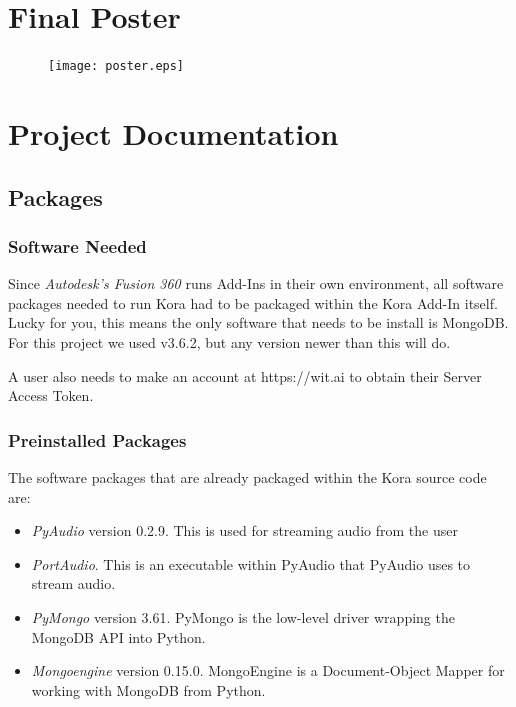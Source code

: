\documentclass[onecolumn, draftclsnofoot,10pt, compsoc]{IEEEtran}
\begin{document}
\section{Final Poster}
	\begin{figure}[H]
		\texttt{[image: poster.eps]}
		\centering
	\end{figure}














\section{Project Documentation}

\subsection{Packages}
\subsubsection{Software Needed}
Since \textit{Autodesk's Fusion 360} runs Add-Ins in their own environment, all software packages needed to run Kora had to be packaged within the Kora Add-In itself.
Lucky for you, this means the only software that needs to be install is MongoDB.
For this project we used v3.6.2, but any version newer than this will do.

A user also needs to make an account at https://wit.ai to obtain their Server Access Token.


\subsubsection{Preinstalled Packages}
The software packages that are already packaged within the Kora source code are:
	\begin{itemize}
		\item \textit{PyAudio} version 0.2.9. This is used for streaming audio from the user
		\item \textit{PortAudio}. This is an executable within PyAudio that PyAudio uses to stream audio.
		\item \textit{PyMongo} version 3.61. PyMongo is the low-level driver wrapping the MongoDB API into Python.
		\item \textit{Mongoengine} version 0.15.0. MongoEngine is a Document-Object Mapper for working with MongoDB from Python.
	\end{itemize}
\end{document}
